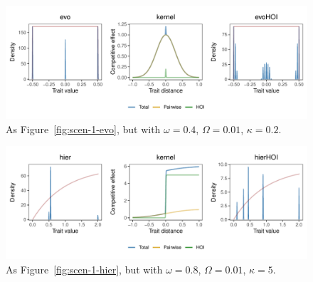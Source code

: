 \documentclass[10pt]{article}
\begin{document}
\begin{figure}[!ht]
  \centering
  \includegraphics[width=\textwidth]{scen-4-evo.pdf}
  \caption{As Figure~\ref{fig:scen-1-evo}, but with $\omega = 0.4$, $\Omega = 0.01$, $\kappa = 0.2$.}
  \label{fig:scen-4-evo}
\end{figure}

\begin{figure}[!ht]
  \centering
  \includegraphics[width=\textwidth]{scen-4-hier.pdf}
  \caption{As Figure~\ref{fig:scen-1-hier}, but with $\omega = 0.8$, $\Omega = 0.01$, $\kappa = 5$.}
  \label{fig:scen-4-hier}
\end{figure}


\clearpage
\end{document}
